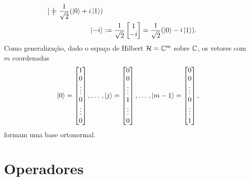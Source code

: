 \begin{example}
\begin{align*}
\begin{bmatrix}
		\end{bmatrix} = \frac{1}{\sqrt{2}}(\ket{0} + i\ket{1}) \\
		\ket{-i} &:= \frac{1}{\sqrt{2}}\begin{bmatrix}
			1 \\
			-i \\
		\end{bmatrix} = \frac{1}{\sqrt{2}}(\ket{0} - i\ket{1}). \\
	\end{align*}
	\noindent
	Como generalização, dado o espaço de Hilbert $\mathcal{H}=\mathbb{C}^m$ sobre $\mathbb{C}$, os vetores com $m$ coordenadas
		\begin{equation*}
		\ket{0} = \begin{bmatrix}
			1 	\\
			0 	\\
			\vdots \\
			0 \\
			\vdots \\
			0
		\end{bmatrix}, \dotso, \ket{j} = \begin{bmatrix}
			0 	\\
			0 	\\
			\vdots \\
			1 \\
			\vdots \\
			0
		\end{bmatrix}, \dotso, \ket{m-1} = \begin{bmatrix}
			0 	\\
			0 	\\
			\vdots \\
			0 \\
			\vdots \\
			1
		\end{bmatrix},
	\end{equation*}
	formam uma base ortonormal.
\end{example}

\section{Operadores}\label{sec:ops}

